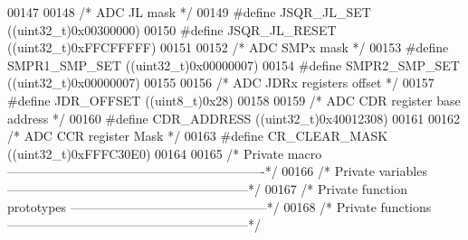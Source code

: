 \begin{DoxyCode}
00147 
00148 \textcolor{comment}{/* ADC JL mask */}
00149 \textcolor{preprocessor}{#}\textcolor{preprocessor}{define} \textcolor{preprocessor}{JSQR\_JL\_SET}               \textcolor{preprocessor}{(}\textcolor{preprocessor}{(}\textcolor{preprocessor}{uint32\_t}\textcolor{preprocessor}{)}0x00300000\textcolor{preprocessor}{)}
00150 \textcolor{preprocessor}{#}\textcolor{preprocessor}{define} \textcolor{preprocessor}{JSQR\_JL\_RESET}             \textcolor{preprocessor}{(}\textcolor{preprocessor}{(}\textcolor{preprocessor}{uint32\_t}\textcolor{preprocessor}{)}0xFFCFFFFF\textcolor{preprocessor}{)}
00151 
00152 \textcolor{comment}{/* ADC SMPx mask */}
00153 \textcolor{preprocessor}{#}\textcolor{preprocessor}{define} \textcolor{preprocessor}{SMPR1\_SMP\_SET}             \textcolor{preprocessor}{(}\textcolor{preprocessor}{(}\textcolor{preprocessor}{uint32\_t}\textcolor{preprocessor}{)}0x00000007\textcolor{preprocessor}{)}
00154 \textcolor{preprocessor}{#}\textcolor{preprocessor}{define} \textcolor{preprocessor}{SMPR2\_SMP\_SET}             \textcolor{preprocessor}{(}\textcolor{preprocessor}{(}\textcolor{preprocessor}{uint32\_t}\textcolor{preprocessor}{)}0x00000007\textcolor{preprocessor}{)}
00155 
00156 \textcolor{comment}{/* ADC JDRx registers offset */}
00157 \textcolor{preprocessor}{#}\textcolor{preprocessor}{define} \textcolor{preprocessor}{JDR\_OFFSET}                \textcolor{preprocessor}{(}\textcolor{preprocessor}{(}\textcolor{preprocessor}{uint8\_t}\textcolor{preprocessor}{)}0x28\textcolor{preprocessor}{)}
00158 
00159 \textcolor{comment}{/* ADC CDR register base address */}
00160 \textcolor{preprocessor}{#}\textcolor{preprocessor}{define} \textcolor{preprocessor}{CDR\_ADDRESS}               \textcolor{preprocessor}{(}\textcolor{preprocessor}{(}\textcolor{preprocessor}{uint32\_t}\textcolor{preprocessor}{)}0x40012308\textcolor{preprocessor}{)}
00161 
00162 \textcolor{comment}{/* ADC CCR register Mask */}
00163 \textcolor{preprocessor}{#}\textcolor{preprocessor}{define} \textcolor{preprocessor}{CR\_CLEAR\_MASK}             \textcolor{preprocessor}{(}\textcolor{preprocessor}{(}\textcolor{preprocessor}{uint32\_t}\textcolor{preprocessor}{)}0xFFFC30E0\textcolor{preprocessor}{)}
00164 
00165 \textcolor{comment}{/* Private macro -------------------------------------------------------------*/}
00166 \textcolor{comment}{/* Private variables ---------------------------------------------------------*/}
00167 \textcolor{comment}{/* Private function prototypes -----------------------------------------------*/}
00168 \textcolor{comment}{/* Private functions ---------------------------------------------------------*/}

\end{DoxyCode}
